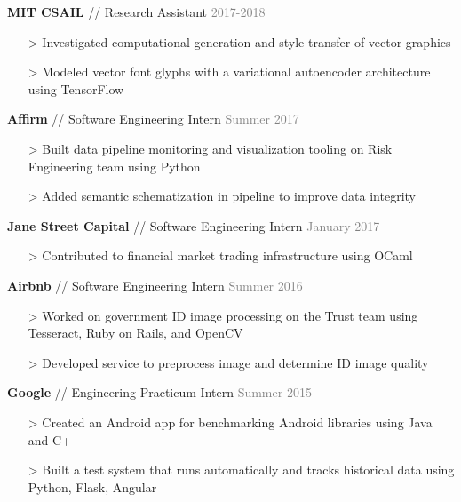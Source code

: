 \documentclass[11pt]{article}
\newcommand{\bt}[1]{\textbf{#1}} %
\newcommand{\gap}[0]{\vspace{0.3em}} %
\newcommand{\sep}[0]{ // } %
\newcommand{\gray}[1]{\textcolor{gray}{#1}}
\newcommand{\e}[0]{> }
\begin{document}
\bt{MIT CSAIL}\sep Research Assistant \hfill \gray{2017-2018}

\begin{itemize}
\item[\e] Investigated computational generation and style transfer of vector graphics
\item[\e] Modeled vector font glyphs with a variational autoencoder architecture using TensorFlow
\end{itemize}


\bt{Affirm}\sep Software Engineering Intern \hfill \gray{Summer 2017}

\begin{itemize}
\item[\e] Built data pipeline monitoring and visualization tooling on Risk Engineering team using Python
\item[\e] Added semantic schematization in pipeline to improve data integrity
\end{itemize}

\gap

\bt{Jane Street Capital}\sep Software Engineering Intern \hfill \gray{January 2017}

\begin{itemize}
\item[\e] Contributed to financial market trading infrastructure using OCaml
\end{itemize}

\gap

\bt{Airbnb}\sep Software Engineering Intern \hfill \gray{Summer 2016}

\begin{itemize}
\item[\e] Worked on government ID image processing on the Trust team using Tesseract, Ruby on Rails, and OpenCV
\item[\e] Developed service to preprocess image and determine ID image quality
\end{itemize}

\gap

\bt{Google}\sep Engineering Practicum Intern \hfill \gray{Summer 2015}

\begin{itemize}
\item[\e] Created an Android app for benchmarking Android libraries using Java and C++
\item[\e] Built a test system that runs automatically and tracks historical data using Python, Flask, Angular
\end{itemize}
\end{document}
